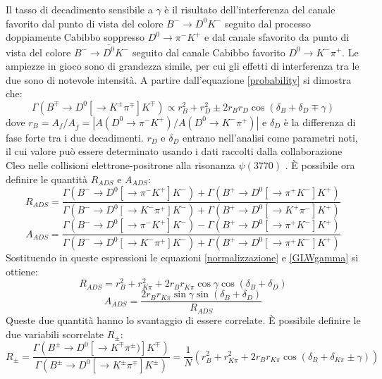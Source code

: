 Il tasso di decadimento sensibile a $\gamma$ è il risultato dell'interferenza del canale favorito dal punto di vista del colore $B^-\rightarrow D^0K^-$ seguito dal processo
doppiamente Cabibbo soppresso $D^0\rightarrow \pi^-K^+$ e dal canale sfavorito da punto di vista del colore $B^-\rightarrow \bar{D^0}K^-$ seguito dal canale
Cabibbo favorito $D^0\rightarrow K^-\pi^+$. Le ampiezze in gioco sono di grandezza simile, per cui gli effetti di interferenza tra le due sono di notevole intensità.
A partire dall'equazione \eqref{probability} si dimostra che:
\begin{equation} \label{GLWgamma}
 \Gamma(B^{\mp}\rightarrow D^0[\rightarrow K^{\pm}\pi^{\mp}]K^{\mp}) \propto r_B^2 + r_D^2 \pm 2r_Br_D \cos(\delta_B + \delta_D \mp \gamma)
\end{equation}
dove $r_B = A_f/A_{\bar{f}} = |A(D^0 \rightarrow \pi^-K^+)/A(D^0\rightarrow K^-\pi^+)|$ e $\delta_D$ è la differenza di fase forte tra i due decadimenti. $r_D$ e $\delta_D$
entrano nell'analisi come parametri noti, il cui valore può essere determinato usando i dati raccolti dalla collaborazione Cleo nelle collisioni elettrone-positrone alla 
risonanza $\psi(3770)$ \cite{cleo}. È possibile ora definire le quantità $R_{ADS}$ e $A_{ADS}$:
\begin{equation}
 R_{ADS} = \frac{\Gamma(B^- \rightarrow D^0[\rightarrow \pi^- K^+]K^-) + \Gamma(B^+ \rightarrow D^0[\rightarrow \pi^+K^-]K^+)}{\Gamma(B^- \rightarrow D^0[\rightarrow K^- \pi^+]K^-) + \Gamma(B^+ \rightarrow D^0[\rightarrow K^+\pi^-]K^+)}
\end{equation}
\begin{equation}
 A_{ADS} = \frac{\Gamma(B^- \rightarrow D^0[\rightarrow \pi^- K^+]K^-) - \Gamma(B^+ \rightarrow D^0[\rightarrow \pi^+K^-]K^+)}{\Gamma(B^- \rightarrow D^0[\rightarrow K^- \pi^+]K^-) + \Gamma(B^+ \rightarrow D^0[\rightarrow \pi^+K^-]K^+)}
\end{equation}
Sostituendo in queste espressioni le equazioni \eqref{normalizzazione} e \eqref{GLWgamma} si ottiene:
\begin{equation}
 R_{ADS} = r_B^2 + r_{K\pi}^2 + 2r_Br_{K\pi}\cos\gamma\cos(\delta_B + \delta_{D})
\end{equation}
\begin{equation}
 A_{ADS} = \frac {2r_B r_{K\pi}\sin\gamma\sin(\delta_B + \delta_{D})}{R_{ADS}}
\end{equation}
Queste due quantità hanno lo svantaggio di essere correlate. È possibile definire le due variabili scorrelate $R_\pm$:
\begin{equation}
 R_{\pm} = \frac{\Gamma(B^{\pm}\rightarrow D^0[\rightarrow K^{\mp}\pi^{\pm})]K^{\mp})}{\Gamma(B^{\pm}\rightarrow D^0[\rightarrow K^{\pm}\pi^{\mp}]K^{\pm})} = \frac{1}{N}(r_B^2 + r_{K\pi}^2 + 2r_Br_{K\pi}\cos(\delta_B + \delta_{K\pi} \pm \gamma)) 
\end{equation}
